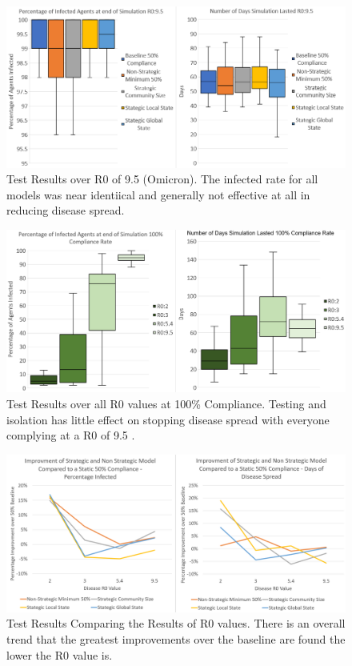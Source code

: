 \documentclass{article}
\begin{document}
\begin{figure}[h!]
\centering
\includegraphics[width=\textwidth]{2}
\caption{Test Results over R0 of 9.5 (Omicron). The infected rate for all models was near identiical and generally not effective at all in reducing disease spread. }
\end{figure}
\newpage

\begin{figure}[h!]
\centering
\includegraphics[width=\textwidth]{6}
\caption{Test Results over all R0 values at 100\% Compliance. Testing and isolation has little effect on stopping disease spread with everyone complying at a R0 of 9.5 .}
\end{figure}

\begin{figure}[h!]
\centering
\includegraphics[width=\textwidth]{1}
\caption{Test Results Comparing the Results of R0 values. There is an overall trend that the greatest improvements over the baseline are found the lower the R0 value is.}
\end{figure}
\newpage
\end{document}
